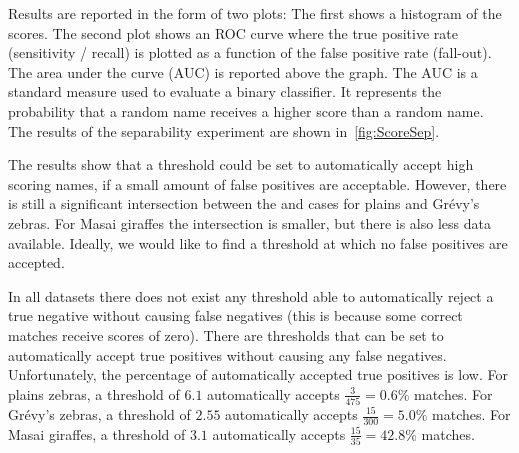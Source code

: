         Results are reported in the form of two plots:
        The first shows a histogram of the scores.
        The second plot shows an ROC curve where the true positive rate (sensitivity / recall) is plotted as a
          function of the false positive rate (fall-out).
        The area under the curve (AUC) is reported above the graph.
        The AUC is a standard measure used to evaluate a binary classifier.
        It represents the probability that a random \groundtrue{} name receives a higher score than a random
          \groundfalse{} name.
        The results of the separability experiment are shown in~\cref{fig:ScoreSep}.


        \ScoreSep{}

        The results show that a threshold could be set to automatically accept high scoring names, if a small
          amount of false positives are acceptable.
        However, there is still a significant intersection between the \groundtrue{} and \groundfalse{} cases for
          plains and Grévy's zebras.
        For Masai giraffes the intersection is smaller, but there is also less data available.
        Ideally, we would like to find a threshold at which no false positives are accepted.

        In all datasets there does not exist any threshold able to automatically reject a true negative without
          causing false negatives (this is because some correct matches receive scores of zero).
        There are thresholds that can be set to automatically accept true positives without causing any false
          negatives.
        Unfortunately, the percentage of automatically accepted true positives is low.
        For plains zebras, a threshold of $6.1$ automatically accepts $\frac{3}{475} = 0.6\percent$ \groundtrue{}
          matches.
        For Grévy's zebras, a threshold of $2.55$ automatically accepts $\frac{15}{300} = 5.0\percent$
          \groundtrue{} matches.
        For Masai giraffes, a threshold of $3.1$ automatically accepts $\frac{15}{35} = 42.8\percent$
          \groundtrue{} matches.

